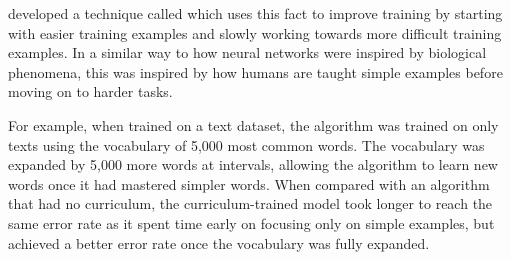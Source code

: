 % 	

\textcite{bengio2009} developed a technique called  which uses this fact to improve training by starting with easier training examples and slowly working towards more difficult training examples.
In a similar way to how neural networks were inspired by biological phenomena, this was inspired by how humans are taught simple examples before moving on to harder tasks.

For example, when trained on a text dataset, the algorithm was trained on only texts using the vocabulary of 5,000 most common words.
The vocabulary was expanded by 5,000 more words at intervals, allowing the algorithm to learn new words once it had mastered simpler words.
When compared with an algorithm that had no curriculum, the curriculum-trained model took longer to reach the same error rate as it spent time early on focusing only on simple examples, but achieved a better error rate once the vocabulary was fully expanded.
